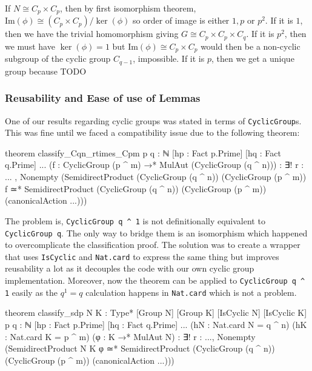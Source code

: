 \documentclass[a4paper,11pt, titlepage]{article}
\theoremstyle{remark}
\begin{document}
If $N \cong C_p \times C_p$, then by first isomorphism theorem, $\text{Im}(\phi) \cong (C_p \times C_p) / \ker(\phi)$ so order of image is either $1, p$ or $p^2$. If it is $1$, then we have the trivial homomorphism giving $G \cong C_p \times C_p \times C_{q}$. If it is $p^2$, then we must have $\ker(\phi) = 1$ but $\text{Im}(\phi) \cong C_p \times C_p$ would then be a non-cyclic subgroup of the cyclic group $C_{q-1}$, impossible. If it is $p$, then we get a unique group because TODO

\subsubsection{Reusability and Ease of use of Lemmas}

One of our results regarding cyclic groups was stated in terms of \texttt{CyclicGroup}s. This was fine until we faced a compatibility issue due to the following theorem:

\begin{leancode}
    theorem classify_Cqn_rtimes_Cpm
    {p q : ℕ} [hp : Fact p.Prime] [hq : Fact q.Prime] ...
    (f : CyclicGroup (p ^ m) →* MulAut (CyclicGroup (q ^ n))) :
    ∃! r : ... , Nonempty (SemidirectProduct (CyclicGroup (q ^ n)) (CyclicGroup (p ^ m)) f ≃*
               SemidirectProduct (CyclicGroup (q ^ n)) (CyclicGroup (p ^ m))
                 (canonicalAction ...)))
\end{leancode}

The problem is, \texttt{CyclicGroup q ^ 1} is not definitionally equivalent to \texttt{CyclicGroup q}. The only way to bridge them is an isomorphism which happened to overcomplicate the classification proof. The solution was to create a wrapper that uses \texttt{IsCyclic} and \texttt{Nat.card} to express the same thing but improves reusability a lot as it decouples the code with our own cyclic group implementation. Moreover, now the theorem can be applied to \texttt{CyclicGroup q ^ 1} easily as the $q^1 = q$ calculation happens in \texttt{Nat.card} which is not a problem.

\begin{leancode}
    theorem classify_sdp
    {N K : Type*} [Group N] [Group K] [IsCyclic N] [IsCyclic K]
    {p q : ℕ} [hp : Fact p.Prime] [hq : Fact q.Prime] ...
    (hN : Nat.card N = q ^ n) (hK : Nat.card K = p ^ m)
    (φ : K →* MulAut N) :
    ∃! r : ...,
      Nonempty (SemidirectProduct N K φ ≃*
               SemidirectProduct (CyclicGroup (q ^ n)) (CyclicGroup (p ^ m))
                 (canonicalAction ...)))
\end{leancode}
\end{document}

